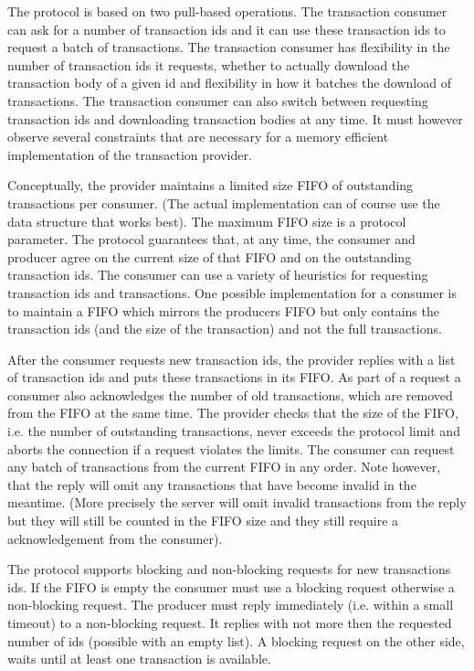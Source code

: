 The protocol is based on two pull-based operations.
The transaction consumer can ask for a number of transaction ids and it can use these
transaction ids to request a batch of transactions.
The transaction consumer has flexibility in the number of transaction ids it requests,
whether to actually download the transaction body of a given id
and flexibility in how it batches the download of transactions.
The transaction consumer can also switch between requesting transaction ids and downloading
transaction bodies at any time.
It must however observe several constraints that are necessary for a memory efficient implementation
of the transaction provider.

Conceptually, the provider maintains a limited size FIFO of outstanding transactions per consumer.
(The actual implementation can of course use the data structure that works best).
The maximum FIFO size is a protocol parameter.
The protocol guarantees that, at any time, the consumer and producer agree on the current size of
that FIFO and on the outstanding transaction ids.
The consumer can use a variety of heuristics for requesting transaction ids and transactions.
One possible implementation for a consumer is to maintain a FIFO which mirrors the producers FIFO
but only contains the transaction ids (and the size of the transaction) and not the full transactions.

After the consumer requests new transaction ids, the provider replies with a list of transaction ids and
puts these transactions in its FIFO.
As part of a request a consumer also acknowledges the number of old transactions,
which are removed from the FIFO at the same time.
The provider checks that the size of the FIFO, i.e. the number of outstanding transactions,
never exceeds the protocol limit and aborts the connection if a request violates the limits.
The consumer can request any batch of transactions from the current FIFO in any order.
Note however, that the reply will omit any transactions that have become invalid in the meantime.
(More precisely the server will omit invalid transactions from the reply but they will still be counted in the FIFO
size and they still require a acknowledgement from the consumer).

The protocol supports blocking and non-blocking requests for new transactions ids.
If the FIFO is empty the consumer must use a blocking request
otherwise a non-blocking request.
The producer must reply immediately (i.e. within a small timeout) to a non-blocking request.
It replies with not more then the requested number of ids (possible with an empty list).
A blocking request on the other side, waits until at least one transaction is available.

